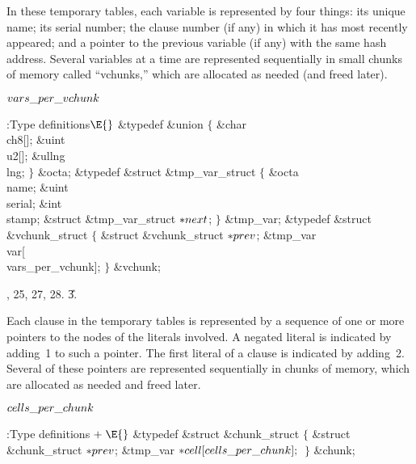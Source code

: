 In these temporary tables, each variable is represented by four things:
its unique name; its serial number; the clause number (if any) in which it has
most recently appeared; and a pointer to the previous variable (if any)
with the same hash address. Several variables at a time
are represented sequentially in small chunks of memory called ``vchunks,''
which are allocated as needed (and freed later).

\Y\B\4\D$\\{vars\_per\_vchunk}$ \5
\par
\Y\B\4:Type definitions\X${}\E{}$\6
\&{typedef} \&{union} ${}\{{}$\1\6
\&{char} \\{ch8}[];\6
\&{uint} \\{u2}[];\6
\&{ullng} \\{lng};\2\6
${}\}{}$ \&{octa};\6
\&{typedef} \&{struct} \&{tmp\_var\_struct} ${}\{{}$\1\6
\&{octa} \\{name};\6
\&{uint} \\{serial};\6
\&{int} \\{stamp};\6
\&{struct} \&{tmp\_var\_struct} ${}{*}\\{next}{}$;\2%
\6
${}\}{}$ \&{tmp\_var};\7
\&{typedef} \&{struct} \&{vchunk\_struct} ${}\{{}$\1\6
\&{struct} \&{vchunk\_struct} ${}{*}\\{prev}{}$;\6
\&{tmp\_var} \\{var}[\\{vars\_per\_vchunk}];\2\6
${}\}{}$ \&{vchunk};\par
{}, 25, 27, 28.
\U3.\fi

Each clause in the temporary tables is represented by a
sequence of
one or more pointers to the  nodes of the literals involved.
A negated literal is indicated by adding~1 to such a pointer.
The first literal of a clause is indicated by adding~2.
Several of these pointers are represented sequentially in chunks
of memory, which are allocated as needed and freed later.

\Y\B\4\D$\\{cells\_per\_chunk}$ \5
\par
\Y\B\4:Type definitions\X${}\mathrel+\E{}$\6
\&{typedef} \&{struct} \&{chunk\_struct} ${}\{{}$\1\6
\&{struct} \&{chunk\_struct} ${}{*}\\{prev}{}$;\6
\&{tmp\_var} ${}{*}\\{cell}[\\{cells\_per\_chunk}];{}$\2\6
${}\}{}$ \&{chunk};\par
\fi

